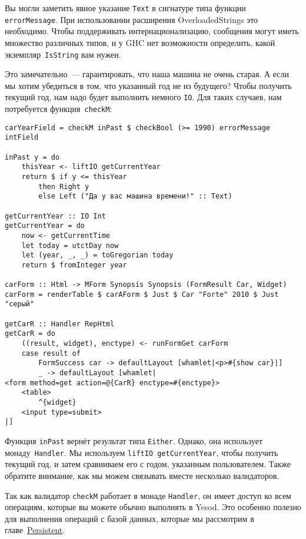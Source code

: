 \begin{remark}
Вы могли заметить явное указание \lstinline'Text' в сигнатуре типа функции
\lstinline'errorMessage'. При использовании расширения OverloadedStrings это
необходимо. Чтобы поддерживать интернационализацию, сообщения могут иметь
множество различных типов, и у GHC нет возможности определить, какой
экземпляр~\lstinline'IsString' вам нужен.
\end{remark}

Это замечательно~--- гарантировать, что наша машина не очень старая. А если мы
хотим убедиться в том, что указанный год не из будущего? Чтобы получить
текущий год, нам надо будет выполнить немного \lstinline'IO'. Для таких
случаев, нам потребуется функция~\lstinline'checkM':

\begin{lstlisting}
carYearField = checkM inPast $ checkBool (>= 1990) errorMessage intField

inPast y = do
    thisYear <- liftIO getCurrentYear
    return $ if y <= thisYear
        then Right y
        else Left ("Да у вас машина времени!" :: Text)

getCurrentYear :: IO Int
getCurrentYear = do
    now <- getCurrentTime
    let today = utctDay now
    let (year, _, _) = toGregorian today
    return $ fromInteger year

carForm :: Html -> MForm Synopsis Synopsis (FormResult Car, Widget)
carForm = renderTable $ carAForm $ Just $ Car "Forte" 2010 $ Just "серый"

getCarR :: Handler RepHtml
getCarR = do
    ((result, widget), enctype) <- runFormGet carForm
    case result of
        FormSuccess car -> defaultLayout [whamlet|<p>#{show car}|]
        _ -> defaultLayout [whamlet|
<form method=get action=@{CarR} enctype=#{enctype}>
    <table>
        ^{widget}
    <input type=submit>
|]
\end{lstlisting}

Функция \lstinline'inPast' вернёт результат типа \lstinline'Either'. Однако,
она использует монаду~\lstinline'Handler'. Мы используем \lstinline'liftIO getCurrentYear',
чтобы получить текущий год, и затем сравниваем его с годом, указанным
пользователем. Также обратите внимание, как мы можем связывать вместе
несколько валидаторов.

\begin{remark}
Так как валидатор \lstinline'checkM' работает в монаде \lstinline'Handler', он
имеет доступ ко всем операциям, которые вы можете обычно выполнять в Yesod.
Это особенно полезно для выполнения операций с базой данных, которые мы
рассмотрим в главе~\hyperref[chap:persistent]{Persistent}.
\end{remark}

